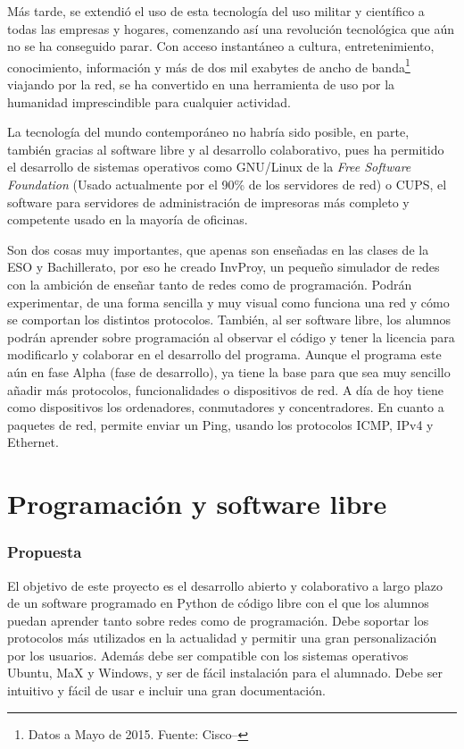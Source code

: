\documentclass[a4paper, 11pt]{report} %
\begin{document}
Más tarde, se extendió el uso de esta tecnología del uso militar y científico a todas las empresas y hogares, comenzando así una revolución tecnológica que aún no se ha conseguido parar. Con acceso instantáneo a cultura, entretenimiento, conocimiento, información y más de dos mil exabytes de ancho de banda\footnote{Datos a Mayo de 2015. Fuente: Cisco--\cite{Cisco}} viajando por la red, se ha convertido en una herramienta de uso por la humanidad imprescindible para cualquier actividad.

La tecnología del mundo contemporáneo no habría sido posible, en parte, también gracias al software libre y al desarrollo colaborativo, pues ha permitido el desarrollo de sistemas operativos como GNU/Linux de la \textit{Free Software Foundation} (Usado actualmente por el 90\% de los servidores de red) o CUPS, el software para servidores de administración de impresoras más completo y competente usado en la mayoría de oficinas.

Son dos cosas muy importantes, que apenas son enseñadas en las clases de la ESO y Bachillerato, por eso he creado InvProy, un pequeño simulador de redes con la ambición de enseñar tanto de redes como de programación. Podrán experimentar, de una forma sencilla y muy visual como funciona una red y cómo se comportan los distintos protocolos. También, al ser software libre, los alumnos podrán aprender sobre programación al observar el código y tener la licencia para modificarlo y colaborar en el desarrollo del programa. Aunque el programa este aún en fase Alpha (fase de desarrollo), ya tiene la base para que sea muy sencillo añadir más protocolos, funcionalidades o dispositivos de red. A día de hoy tiene como dispositivos los ordenadores, conmutadores y concentradores. En cuanto a paquetes de red, permite enviar un Ping, usando los protocolos ICMP, IPv4 y Ethernet.

\newpage

\setcounter{chapter}{0}    
\chapter{Programación y software libre}

\subsection*{Propuesta}
El objetivo de este proyecto es el desarrollo abierto  y colaborativo a largo plazo de un software programado en Python de código libre con el que los alumnos puedan aprender tanto sobre redes como de programación. Debe soportar los protocolos más utilizados en la actualidad y permitir una gran personalización por los usuarios. Además debe ser compatible con los sistemas operativos Ubuntu, MaX y Windows, y ser de fácil instalación para el alumnado. Debe ser intuitivo y fácil de usar e incluir una gran documentación.
\end{document}
